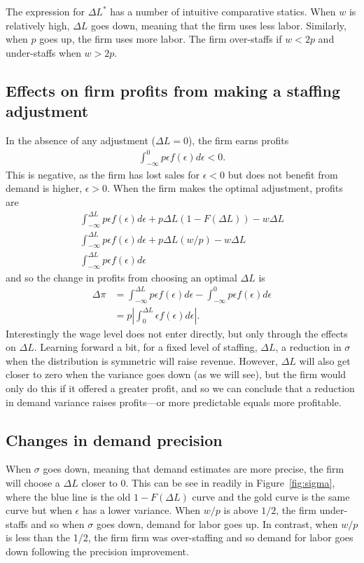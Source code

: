 \documentclass[11pt]{article}
\begin{document}
The expression for $\Delta L^*$ has a number of intuitive comparative statics.
When $w$ is relatively high, $\Delta L$ goes down, meaning that the firm uses less labor.
Similarly, when $p$ goes up, the firm uses more labor.
The firm over-staffs if $w < 2p$ and under-staffs when $w > 2p$. 


\subsection{Effects on firm profits from making a staffing adjustment}
In the absence of any adjustment ($\Delta L = 0$), the firm earns profits
\begin{align} 
\int_{-\infty}^{0} p \epsilon f(\epsilon) d\epsilon < 0. 
\end{align} 
This is negative, as the firm  has lost sales for $\epsilon < 0$ but does not benefit from demand is higher, $\epsilon > 0$.
When the firm makes the optimal adjustment, profits are
\begin{align}
  \int_{-\infty}^{\Delta L} p \epsilon f(\epsilon) d\epsilon + p \Delta L \left(1 - F(\Delta L) \right) - w \Delta L \nonumber \\
  \int_{-\infty}^{\Delta L} p \epsilon f(\epsilon) d\epsilon + p \Delta L (w/p) - w \Delta L \nonumber \\
   \int_{-\infty}^{\Delta L} p \epsilon f(\epsilon) d\epsilon 
\end{align} 
and so the change in profits from choosing an optimal $\Delta L$ is
\begin{align}
  \Delta \pi & = \int_{-\infty}^{\Delta L} p \epsilon f(\epsilon) d\epsilon - \int_{-\infty}^{0} p \epsilon f(\epsilon) d\epsilon \nonumber \\
             & = p \left| \int_{0}^{\Delta L} \epsilon f(\epsilon) d\epsilon \right|. 
\end{align}
Interestingly the wage level does not enter directly, but only through the effects on $\Delta L$.
Learning forward a bit, for a fixed level of staffing, $\Delta L$, a reduction in $\sigma$ when the distribution is symmetric will raise revenue.
However, $\Delta L$ will also get closer to zero when the variance goes down (as we will see), but the firm would only do this if it offered a greater profit, and so we can conclude that a reduction in demand variance raises profits---or more predictable equals more profitable.  

\subsection{Changes in demand precision}
When $\sigma$ goes down, meaning that demand estimates are more precise, the firm will choose a $\Delta L$ closer to $0$.
This can be see in readily in Figure~\ref{fig:sigma}, where the blue line is the old $1 - F(\Delta L)$ curve and the gold curve is the same curve but when $\epsilon$ has a lower variance.  
When $w/p$ is above $1/2$, the firm under-staffs and so when $\sigma$ goes down, demand for labor goes up.
In contrast, when $w/p$ is less than the 1/2, the firm firm was over-staffing and so demand for labor goes down following the precision improvement. 
\end{document}
